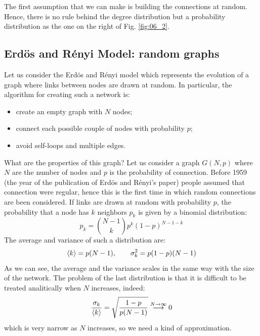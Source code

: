 \documentclass[../main/main.tex]{subfiles}
\begin{document}
The first assumption that we can make is building the connections at random. Hence, there is no rule behind the degree distribution but a probability distribution as the one on the right of Fig. \ref{fig:06_2}.

\subsection{Erdös and Rényi Model: random graphs}
Let us consider the Erdös and Rényi model which represents the evolution of a graph where links between nodes are drawn at random. In particular, the algorithm for creating such a network is:
\begin{itemize}
\item create an empty graph with $N$ nodes;
\item connect each possible couple of nodes with probability $p$;
\item avoid self-loops and multiple edges.
\end{itemize}
What are the properties of this graph?
Let us consider a graph \( G(N,p) \) where \( N \) are the number of nodes and \( p \) is the probability of connection.
Before 1959 (the year of the publication of Erdös and Rényi's paper) people assumed that connection were regular, hence this is the first time in which random connections are been considered.
If links are drawn at random with probability $p$, the probability that a node has $k$ neighbors $p_k$ is given by a binomial distribution:
\begin{equation}
  p_k = \binom{N-1}{k} p^k (1-p)^{N-1-k}
\end{equation}
The average and variance of such a distribution are:
\begin{equation}
  \expval{k} = p(N-1), \qquad \sigma _k^2 = p(1-p)(N-1)
\end{equation}
As we can see, the average and the variance scales in the same way with the size of the network.
The problem of the last distribution is that it is difficult to be treated analitically when \( N \) increases, indeed:
\begin{equation*}
  \frac{\sigma _k}{\expval{k} } = \sqrt{\frac{1-p}{p(N-1)}} \overset{N \rightarrow \infty }{\longrightarrow } 0
\end{equation*}
which is very narrow as \( N \) increases, so we need a kind of approximation.
\end{document}
